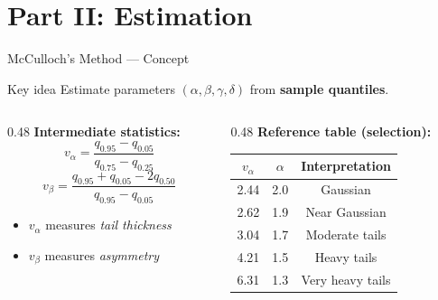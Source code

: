 \documentclass[9pt, aspectratio=169, t]{beamer}
\theoremstyle{definition}
\begin{document}
\section{Part II: Estimation}

\begin{frame}{McCulloch's Method --- Concept}
\begin{block}{Key idea}
Estimate parameters $(\alpha, \beta, \gamma, \delta)$ from \textbf{sample quantiles}.
\end{block}

\begin{columns}[T]
\begin{column}{0.48\textwidth}
\textbf{Intermediate statistics:}
$$v_\alpha = \frac{q_{0.95} - q_{0.05}}{q_{0.75} - q_{0.25}}$$
$$v_\beta = \frac{q_{0.95} + q_{0.05} - 2q_{0.50}}{q_{0.95} - q_{0.05}}$$

\vspace{0.2cm}
\begin{itemize}
    \item $v_\alpha$ measures \textit{tail thickness}
    \item $v_\beta$ measures \textit{asymmetry}
\end{itemize}
\end{column}
\begin{column}{0.48\textwidth}
\textbf{Reference table (selection):}

\renewcommand{\arraystretch}{1.2}
\begin{tabular}{ccc}
\toprule
$v_\alpha$ & $\alpha$ & Interpretation \\
\midrule
2.44 & 2.0 & Gaussian \\
2.62 & 1.9 & Near Gaussian \\
3.04 & 1.7 & Moderate tails \\
4.21 & 1.5 & Heavy tails \\
6.31 & 1.3 & Very heavy tails \\
\bottomrule
\end{tabular}
\end{column}
\end{columns}
\end{frame}
\end{document}
